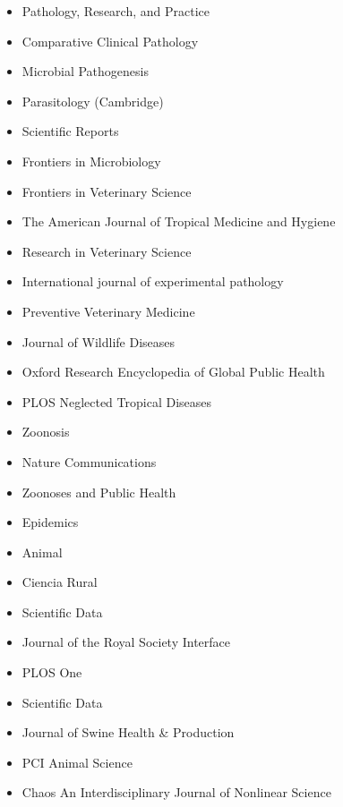 \documentclass[11pt]{article}
\begin{document}
\begin{itemize}
  \item Pathology, Research, and Practice
  \item Comparative Clinical Pathology
  \item Microbial Pathogenesis 
  \item Parasitology (Cambridge) 
  \item Scientific Reports 
  \item Frontiers in Microbiology 
  \item Frontiers in Veterinary Science
  \item The American Journal of Tropical Medicine and Hygiene
  \item Research in Veterinary Science
  \item International journal of experimental pathology 
  \item Preventive Veterinary Medicine 
  \item Journal of Wildlife Diseases  
  \item Oxford Research Encyclopedia of Global Public Health
  \item PLOS Neglected Tropical Diseases
  \item Zoonosis 
  \item Nature Communications
  \item Zoonoses and Public Health
  \item Epidemics
  \item Animal
  \item Ciencia Rural
  \item Scientific Data
  \item Journal of the Royal Society Interface
  \item PLOS One
  \item Scientific Data
  \item Journal of Swine Health & Production
  \item PCI Animal Science
  \item Chaos An Interdisciplinary Journal of Nonlinear Science
\end{itemize}
\end{document}
